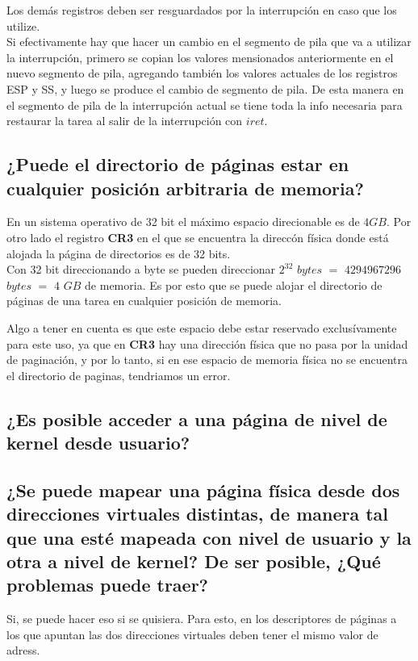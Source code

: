\documentclass[a4paper,10pt,twoside]{article}
\begin{document}
Los demás registros deben ser resguardados por la interrupción en caso que los utilize.\\

Si efectivamente hay que hacer un cambio en el segmento de pila que va a utilizar la interrupción, primero se copian los valores mensionados anteriormente en el nuevo segmento de pila, agregando también los valores actuales de  los registros ESP y SS, y luego se produce el cambio de segmento de pila. De esta manera en el segmento de pila de la interrupción actual se tiene toda la info necesaria para restaurar la tarea al salir de la interrupción con $iret$.


\subsection{¿Puede el directorio de páginas estar en cualquier posición arbitraria de memoria?}
En un sistema operativo de 32 bit el máximo espacio direcionable es de $4GB$. Por otro lado el registro \textbf{CR3} en el que se encuentra la direccón física donde está alojada la página de directorios es de 32 bits. \\

Con 32 bit direccionando a byte se pueden direccionar $2^{32}$ $bytes$ $=$ $4294967296$ $bytes$ $=$ $4$ $GB$ de memoria. Es por esto que se puede alojar el directorio de páginas de una tarea en cualquier posición de memoria. 

Algo a tener en cuenta es que este espacio debe estar reservado exclusívamente para este uso, ya que en \textbf{CR3} hay una dirección física que no pasa por la unidad de paginación, y por lo tanto, si en ese espacio de memoria física no se encuentra el directorio de paginas, tendriamos un error.

\subsection{¿Es posible acceder a una página de nivel de kernel desde usuario?}

\subsection{¿Se puede mapear una página física desde dos direcciones virtuales distintas, de manera tal que una esté mapeada con nivel de usuario y la otra a nivel de kernel? De ser posible, ¿Qué problemas puede traer?}
Si, se puede hacer eso si se quisiera. Para esto, en los descriptores de páginas a los que apuntan las dos direcciones virtuales deben tener el mismo valor de adress.
\end{document}
